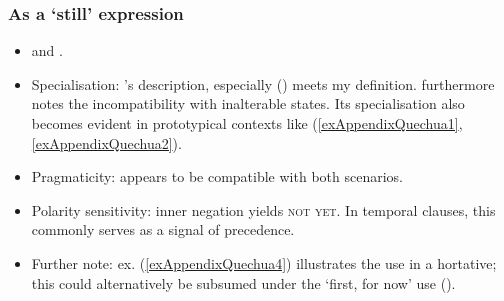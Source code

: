 \subsubsection{As a \lq{}still\rq{ }expression}
\begin{itemize}
	\item \textcite[75–76, 343, 386–392]{Weber1989} and \textcite[640]{WeberEtAl2008}.
	\item Specialisation: \citeauthor{Weber1989}'s description, especially (\citeyear[391]{Weber1989}) meets my definition. \citeauthor{Weber1989} furthermore notes the incompatibility with inalterable states. Its specialisation also becomes evident in prototypical contexts like (\ref{exAppendixQuechua1}, \ref{exAppendixQuechua2}).
	\item Pragmaticity: appears to be compatible with both scenarios.
	\item Polarity sensitivity: inner negation yields \textsc{not yet}. In temporal clauses, this commonly serves as a signal of precedence. 
	\item Further note: ex. (\ref{exAppendixQuechua4}) illustrates the use in a hortative; this could alternatively be subsumed under the \lq first, for now\rq{ }use ().
\end{itemize}

